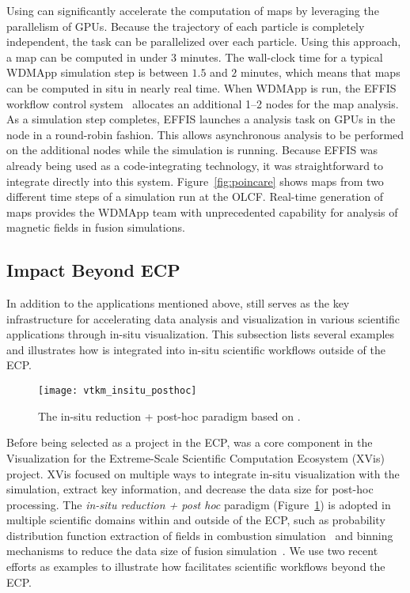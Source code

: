 Using \vtkm can significantly accelerate the computation of \poincare maps by leveraging the parallelism of GPUs. Because the trajectory of each particle is completely independent, the task can be parallelized over each particle. Using this approach, a \poincare map can be computed in under $3$ minutes. The wall-clock time for a typical WDMApp simulation step is between $1.5$ and $2$ minutes, which means that \poincare maps can be computed in situ in nearly real time.
When WDMApp is run, the EFFIS workflow control system~\citep{Suchyta2022:effis} allocates an additional 1--2 nodes for the \poincare map analysis. As a simulation step completes, EFFIS launches a \poincare analysis task on GPUs in the node in a round-robin fashion. This allows asynchronous analysis to be performed on the additional nodes while the simulation is running.
Because EFFIS was already being used as a code-integrating technology, it was straightforward to integrate \vtkm directly into this system.
Figure~\ref{fig:poincare} shows \poincare maps from two different time steps of a simulation run at the OLCF.
Real-time generation of \poincare maps provides the WDMApp team with unprecedented capability for analysis of magnetic fields in fusion simulations.


\subsection{Impact Beyond ECP}


In addition to the applications mentioned above, \vtkm still serves as the key infrastructure for accelerating data analysis and visualization in various scientific applications through in-situ visualization. This subsection lists several examples and illustrates how \vtkm is integrated into in-situ scientific workflows outside of the ECP.


\begin{figure}[htb]
  \centering
\texttt{[image: vtkm\_insitu\_posthoc]}
\caption{The in-situ reduction + post-hoc paradigm based on \vtkm.}
\label{fig:vtkm_insitu_posthoc}
\end{figure}

Before being selected as a project in the ECP, \vtkm was a core component in the Visualization for the Extreme-Scale Scientific Computation Ecosystem (XVis)~\citep{Moreland2019} project. 
XVis focused on multiple ways to integrate in-situ visualization with the simulation, extract key information, and decrease the data size for post-hoc processing.
The \textit{in-situ reduction + post hoc} paradigm (Figure~\ref{fig:vtkm_insitu_posthoc}) is adopted in multiple scientific domains within and outside of the ECP, such as probability distribution function extraction of fields in combustion simulation~\citep{Ye2016} and binning mechanisms to reduce the data size of fusion simulation~\citep{Kress2018}. We use two recent efforts as examples to illustrate how \vtkm facilitates scientific workflows beyond the ECP.


